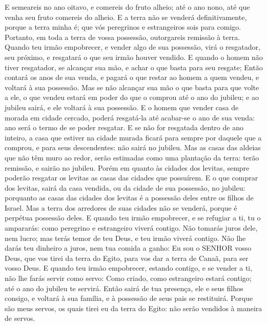 {{  E semeareis no ano oitavo, e comereis do fruto alheio; até o ano nono, até que venha seu fruto comereis do alheio.
  E a terra não se venderá definitivamente, porque a terra minha é; que vós peregrinos e estrangeiros sois para comigo.
  Portanto, em toda a terra de vossa possessão, outorgareis remissão à terra.
  Quando teu irmão empobrecer, e vender algo de sua possessão, virá o resgatador, seu próximo, e resgatará o que seu irmão houver vendido.
  E quando o homem não tiver resgatador, se alcançar sua mão, e achar o que basta para seu resgate;
  Então contará os anos de sua venda, e pagará o que restar ao homem a quem vendeu, e voltará à sua possessão.
  Mas se não alcançar sua mão o que basta para que volte a ele, o que vendeu estará em poder do que o comprou até o ano do jubileu; e ao jubileu sairá, e ele voltará à sua possessão.
  E o homem que vender casa de morada em cidade cercado, poderá resgatá-la até acabar-se o ano de sua venda: ano será o termo de se poder resgatar.
  E se não for resgatada dentro de ano inteiro, a casa que estiver na cidade murada ficará para sempre por daquele que a comprou, e para seus descendentes: não sairá no jubileu.
  Mas as casas das aldeias que não têm muro ao redor, serão estimadas como uma plantação da terra: terão remissão, e sairão no jubileu.
  Porém em quanto às cidades dos levitas, sempre poderão resgatar os levitas as casas das cidades que possuírem.
  E o que comprar dos levitas, sairá da casa vendida, ou da cidade de sua possessão, no jubileu: porquanto as casas das cidades dos levitas é a possessão deles entre os filhos de Israel.
  Mas a terra dos arredores de suas cidades não se venderá, porque é perpétua possessão deles.
  E quando teu irmão empobrecer, e se refugiar a ti, tu o ampararás: como peregrino e estrangeiro viverá contigo.
  Não tomarás juros dele, nem lucro; mas terás temor de teu Deus, e teu irmão viverá contigo.
  Não lhe darás teu dinheiro a juros, nem tua comida a ganho:
  Eu sou o SENHOR vosso Deus, que vos tirei da terra do Egito, para vos dar a terra de Canaã, para ser vosso Deus.
  E quando teu irmão empobrecer, estando contigo, e se vender a ti, não lhe farás servir como servo:
  Como criado, como estrangeiro estará contigo; até o ano do jubileu te servirá.
  Então sairá de tua presença, ele e seus filhos consigo, e voltará à sua família, e à possessão de seus pais se restituirá.
  Porque são meus servos, os quais tirei eu da terra do Egito: não serão vendidos à maneira de servos.
}}
